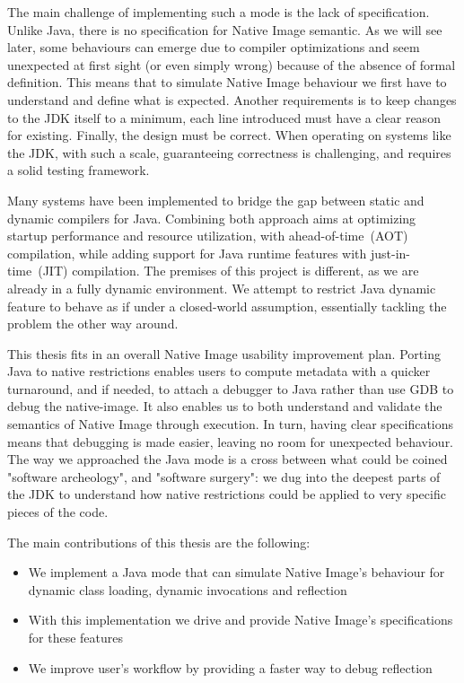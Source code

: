 The main challenge of implementing such a mode is the lack of specification. Unlike Java, there is no specification for Native Image semantic. As we will see later, some behaviours can emerge due to compiler optimizations and seem unexpected at first sight (or even simply wrong) because of the absence of formal definition.
This means that to simulate Native Image behaviour we first have to understand and define what is expected.
Another requirements is to keep changes to the JDK itself to a minimum, each line introduced must have a clear reason for existing.
Finally, the design must be correct. When operating on systems like the JDK, with such a scale, guaranteeing correctness is challenging, and requires a solid testing framework. 

Many systems have been implemented to bridge the gap between static and dynamic compilers for Java. Combining both approach aims at optimizing startup performance and resource utilization, with ahead-of-time~(AOT) compilation, while adding support for Java runtime features with just-in-time~(JIT) compilation.
The premises of this project is different, as we are already in a fully dynamic environment. We attempt to restrict Java dynamic feature to behave as if under a closed-world assumption, essentially tackling the problem the other way around.

This thesis fits in an overall Native Image usability improvement plan.
Porting Java to native restrictions enables users to compute metadata with a quicker turnaround, and if needed, to attach a debugger to Java rather than use GDB to debug the native-image. It also enables us to both understand and validate the semantics of Native Image through execution. In turn, having clear specifications means that debugging is made easier, leaving no room for unexpected behaviour.
The way we approached the Java mode is a cross between what could be coined "software archeology", and 
"software surgery": we dug into the deepest parts of the JDK to understand how native restrictions could be applied to very specific pieces of the code.


 

The main contributions of this thesis are the following:
\begin{itemize}
  \item We implement a Java mode that can simulate Native Image's behaviour for dynamic class loading, dynamic invocations and reflection
  \item With this implementation we drive and provide Native Image's specifications for these features
  \item We improve user's workflow by providing a faster way to debug reflection
\end{itemize}

